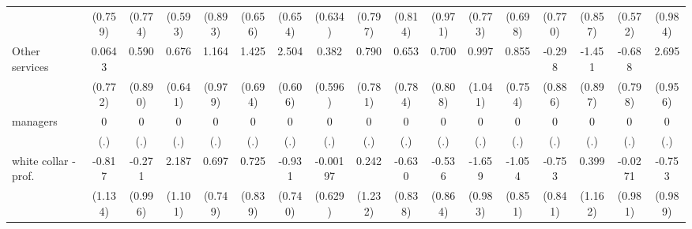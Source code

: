{\begin{tabular}{l*{16}{c}}
                    &     (0.759)         &     (0.774)         &     (0.593)         &     (0.893)         &     (0.656)         &     (0.654)         &     (0.634)         &     (0.797)         &     (0.814)         &     (0.971)         &     (0.773)         &     (0.698)         &     (0.770)         &     (0.857)         &     (0.572)         &     (0.984)         \\
[1em]
Other services      &      0.0643         &       0.590         &       0.676         &       1.164         &       1.425\sym{*}  &       2.504\sym{***}&       0.382         &       0.790         &       0.653         &       0.700         &       0.997         &       0.855         &      -0.298         &      -1.451         &      -0.688         &       2.695\sym{**} \\
                    &     (0.772)         &     (0.890)         &     (0.641)         &     (0.979)         &     (0.694)         &     (0.606)         &     (0.596)         &     (0.781)         &     (0.784)         &     (0.808)         &     (1.041)         &     (0.754)         &     (0.886)         &     (0.897)         &     (0.798)         &     (0.956)         \\
[1em]
managers            &           0         &           0         &           0         &           0         &           0         &           0         &           0         &           0         &           0         &           0         &           0         &           0         &           0         &           0         &           0         &           0         \\
                    &         (.)         &         (.)         &         (.)         &         (.)         &         (.)         &         (.)         &         (.)         &         (.)         &         (.)         &         (.)         &         (.)         &         (.)         &         (.)         &         (.)         &         (.)         &         (.)         \\
[1em]
white collar - prof.&      -0.817         &      -0.271         &       2.187\sym{*}  &       0.697         &       0.725         &      -0.931         &    -0.00197         &       0.242         &      -0.630         &      -0.536         &      -1.659         &      -1.054         &      -0.753         &       0.399         &     -0.0271         &      -0.753         \\
                    &     (1.134)         &     (0.996)         &     (1.101)         &     (0.749)         &     (0.839)         &     (0.740)         &     (0.629)         &     (1.232)         &     (0.838)         &     (0.864)         &     (0.983)         &     (0.851)         &     (0.841)         &     (1.162)         &     (0.981)         &     (0.989)         \\

\end{tabular}}
